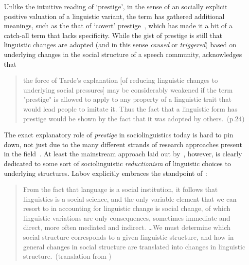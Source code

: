 Unlike the intuitive reading of `prestige', in the sense of an socially explicit positive valuation of a linguistic variant, the term has gathered additional meanings, such as the that of `covert' prestige~\citep{Trudgill1972}, which has made it a bit of a catch-all term that lacks specificity.
While the gist of prestige is still that linguistic changes are adopted (and in this sense \emph{caused} or \emph{triggered}) based on underlying changes in the social structure of a speech community, \citet{Labov2001} acknowledges that

\begin{quote}
the force of Tarde's explanation [of reducing linguistic changes to underlying social pressures] may be considerably weakened if the term "prestige" is allowed to apply to any property of a linguistic trait that would lead people to imitate it. Thus the fact that a linguistic form has prestige would be shown by the fact that it was adopted by others.~(p.24)
\end{quote}


The exact explanatory role of \emph{prestige} in sociolinguistics today is hard to pin down, not just due to the many different strands of research approaches present in the field~\citep{Tagliamonte2015}. At least the mainstream approach laid out by~\citet{Labov2001}, however, is clearly dedicated to some sort of sociolinguistic \emph{reductionism} of linguistic choices to underlying structures. Labov explicitly embraces the standpoint of~\citet{Meillet1926}:


\begin{quote}
From the fact that language is a social institution, it follows that linguistics is a social science, and the only variable element that we can resort to in accounting for linguistic change is social change, of which linguistic variations are only consequences, sometimes immediate and direct, more often mediated and indirect. \ldots We must determine which social structure corresponds to a given linguistic structure, and how in general changes in social structure are translated into changes in linguistic structure.~(translation from \citealt[p.22-23]{Labov2001})
\end{quote}

